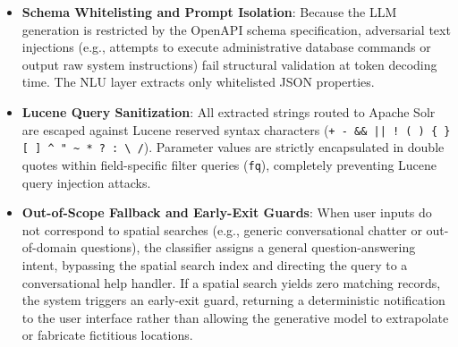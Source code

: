 \begin{itemize}
    \item \textbf{Schema Whitelisting and Prompt Isolation}: Because the LLM generation is restricted by the OpenAPI schema specification, adversarial text injections (e.g., attempts to execute administrative database commands or output raw system instructions) fail structural validation at token decoding time. The NLU layer extracts only whitelisted JSON properties.
    \item \textbf{Lucene Query Sanitization}: All extracted strings routed to Apache Solr are escaped against Lucene reserved syntax characters (\texttt{+ - \&\& || ! ( ) \{ \} [ ] \^{} " \~{} * ? : \textbackslash{} /}). Parameter values are strictly encapsulated in double quotes within field-specific filter queries (\texttt{fq}), completely preventing Lucene query injection attacks.
    \item \textbf{Out-of-Scope Fallback and Early-Exit Guards}: When user inputs do not correspond to spatial searches (e.g., generic conversational chatter or out-of-domain questions), the classifier assigns a general question-answering intent, bypassing the spatial search index and directing the query to a conversational help handler. If a spatial search yields zero matching records, the system triggers an early-exit guard, returning a deterministic notification to the user interface rather than allowing the generative model to extrapolate or fabricate fictitious locations.
\end{itemize}
